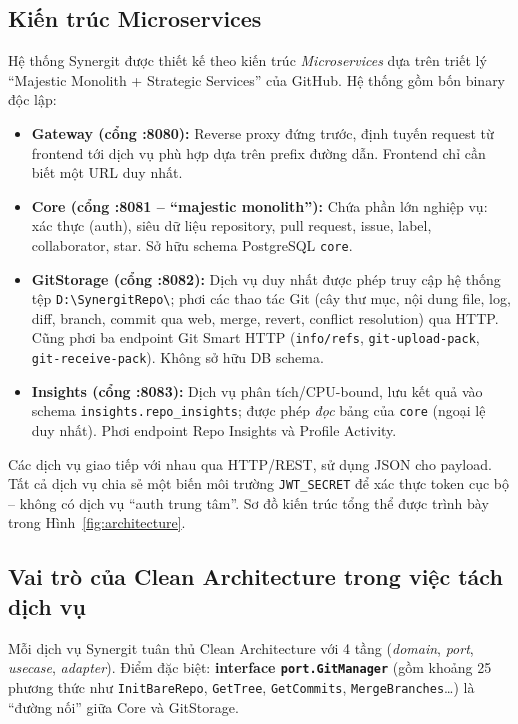 \subsection{Kiến trúc Microservices}
Hệ thống Synergit được thiết kế theo kiến trúc \textit{Microservices} dựa trên triết lý ``Majestic Monolith + Strategic Services'' của GitHub. Hệ thống gồm bốn binary độc lập:

\begin{itemize}
\item \textbf{Gateway (cổng :8080):} Reverse proxy đứng trước, định tuyến request từ frontend tới dịch vụ phù hợp dựa trên prefix đường dẫn. Frontend chỉ cần biết một URL duy nhất.
\item \textbf{Core (cổng :8081 -- ``majestic monolith''):} Chứa phần lớn nghiệp vụ: xác thực (auth), siêu dữ liệu repository, pull request, issue, label, collaborator, star. Sở hữu schema PostgreSQL \texttt{core}.
\item \textbf{GitStorage (cổng :8082):} Dịch vụ duy nhất được phép truy cập hệ thống tệp \texttt{D:\textbackslash SynergitRepo\textbackslash}; phơi các thao tác Git (cây thư mục, nội dung file, log, diff, branch, commit qua web, merge, revert, conflict resolution) qua HTTP. Cũng phơi ba endpoint Git Smart HTTP (\texttt{info/refs}, \texttt{git-upload-pack}, \texttt{git-receive-pack}). Không sở hữu DB schema.
\item \textbf{Insights (cổng :8083):} Dịch vụ phân tích/CPU-bound, lưu kết quả vào schema \texttt{insights.repo\_insights}; được phép \textit{đọc} bảng của \texttt{core} (ngoại lệ duy nhất). Phơi endpoint Repo Insights và Profile Activity.
\end{itemize}

Các dịch vụ giao tiếp với nhau qua HTTP/REST, sử dụng JSON cho payload. Tất cả dịch vụ chia sẻ một biến môi trường \texttt{JWT\_SECRET} để xác thực token cục bộ -- không có dịch vụ ``auth trung tâm''. Sơ đồ kiến trúc tổng thể được trình bày trong Hình~\ref{fig:architecture}.



\subsection{Vai trò của Clean Architecture trong việc tách dịch vụ}
Mỗi dịch vụ Synergit tuân thủ Clean Architecture với 4 tầng (\textit{domain}, \textit{port}, \textit{usecase}, \textit{adapter}). Điểm đặc biệt: \textbf{interface \texttt{port.GitManager}} (gồm khoảng 25 phương thức như \texttt{InitBareRepo}, \texttt{GetTree}, \texttt{GetCommits}, \texttt{MergeBranches}\ldots) là ``đường nối'' giữa Core và GitStorage.

